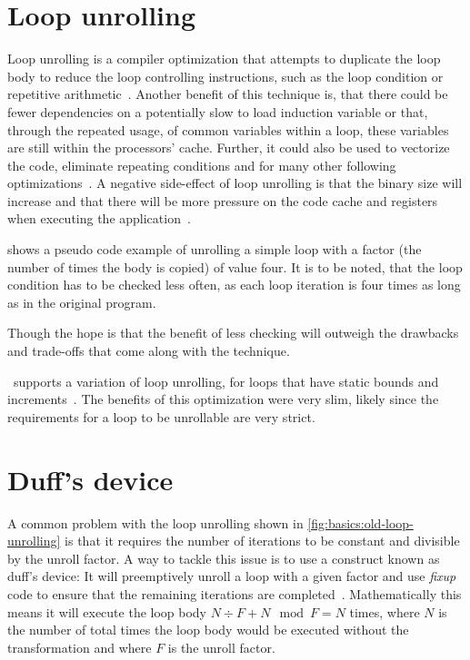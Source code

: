 

\section{Loop unrolling}\label{sec:basics:unrolling}

Loop unrolling is a compiler optimization that attempts to duplicate the loop body to reduce the loop controlling instructions, such as the loop condition or repetitive arithmetic~\cite{aho_ullman_1979}.
Another benefit of this technique is, that there could be fewer dependencies on a potentially slow to load induction variable or that, through the repeated usage, of common variables within a loop, these variables are still within the processors' cache.
Further, it could also be used to vectorize the code, eliminate repeating conditions and for many other following optimizations~\cite{fog_2018}.
A negative side-effect of loop unrolling is that the binary size will increase and that there will be more pressure on the code cache and registers when executing the application~\cite{Sarkar2001}.

 shows a pseudo code example of unrolling a simple loop with a factor (the number of times the body is copied) of value four.
It is to be noted, that the loop condition has to be checked less often, as each loop iteration is four times as long as in the original program.

Though the hope is that the benefit of less checking will outweigh the drawbacks and trade-offs that come along with the technique.

\libFIRM~supports a variation of loop unrolling, for loops that have static bounds and increments~\cite{aebi18bachelorarbeit}.
The benefits of this optimization were very slim, likely since the requirements for a loop to be unrollable are very strict.




\section{Duff's device}\label{sec:basics:duffs}

A common problem with the loop unrolling shown in \cref{fig:basics:old-loop-unrolling} is that it requires the number of iterations to be constant and divisible by the unroll factor.
A way to tackle this issue is to use a construct known as duff's device: It will preemptively unroll a loop with a given factor and use \textit{fixup} code to ensure that the remaining iterations are completed~\cite{duff_1983}.
Mathematically this means it will execute the loop body $N \div F + N \mod F = N$ times, where $N$ is the number of total times the loop body would be executed without the transformation and where $F$ is the unroll factor.

